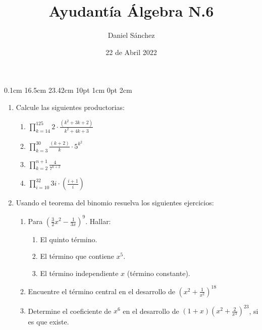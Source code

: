 \documentclass[12pt]{article}
\newcommand{\D}{\displaystyle}
\begin{document}
\setmargins{2.5cm}
{0.1cm}
{16.5cm}
{23.42cm}
{10pt}
{1cm}
{0pt}
{2cm}

\title{Ayudant\'ia \'Algebra N.6}
\date{22 de Abril 2022}
\author{Daniel S\'anchez}
\maketitle

\begin{enumerate}
      \item Calcule las siguientes productorias:
            \begin{enumerate}
                  \item $\D \prod_{k=14}^{125} 2 \cdot \frac{(k^2+3k+2)}{k^2+4k+3}$
                  \item $\D \prod_{k=3}^{30} \frac{(k+2)}{k} \cdot 5^{k^2}$
                  \item $\D \prod_{k=2}^{n+1} \frac{4}{7^{k+2}}$
                  \item $\D \prod_{i=10}^{32} 3i \cdot \left(\frac{i+1}{i}\right)$
            \end{enumerate}
      \item Usando el teorema del binomio resuelva los siguientes ejercicios:
            \begin{enumerate}
                  \item Para $\D \left(\frac{3}{2}x^2-\frac{1}{3x}\right)^9$. Hallar:
                        \begin{enumerate}
                              \item El quinto t\'ermino.
                              \item El t\'ermino que contiene $x^5$.
                              \item El t\'ermino independiente $x$ (t\'ermino constante).
                        \end{enumerate}
                  \item Encuentre el t\'ermino central en el desarrollo de $\D \left({x^2 +\frac{1}{x^2}}\right)^{18}$
                  \item Determine el coeficiente de $x^6$ en el desarrollo de $\D (1+x)\left(x^2 + \frac{2}{x^3}\right)^{23}$, si es que existe.
            \end{enumerate}
\end{enumerate}
\end{document}
